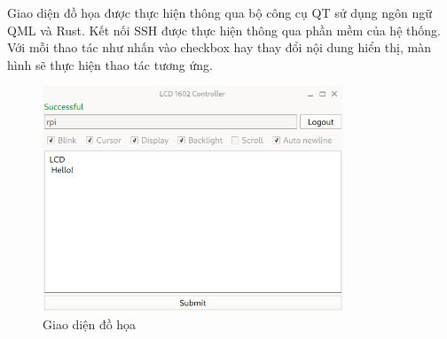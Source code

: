 Giao diện đồ họa được thực hiện thông qua bộ công cụ QT sử dụng ngôn ngữ QML và Rust. Kết nối SSH được thực hiện thông qua phần mềm của hệ thống. Với mỗi thao tác như nhấn vào checkbox hay thay đổi nội dung hiển thị, màn hình sẽ thực hiện thao tác tương ứng.
\begin{figure}[H]
	\centering
	\includegraphics[width=0.8\textwidth]{../images/gui.png}
	\caption{Giao diện đồ họa}
\end{figure}